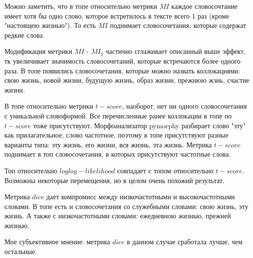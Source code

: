 \documentclass{article}
\begin{document}
    Можно заметить, что в топе относительно метрики $MI$ каждое словосочтание имеет хотя бы одно слово, которое встретилось в тексте всего 1 раз (кроме "настоящею жизнью"). То есть $MI$ поднимает словосочетания, которые содержат редкие слова.

    Модификация метрики $MI$ - $MI_3$ частично сглаживает описанный выше эффект, тк увеличивает значимость словосочетаний, которые встречаются более одного раза. В топе появились словосочетания, которые можно назвать коллокациями: свою жизнь, новой жизни, будущую жизнь, образ жизни, прежнюю жзнь, счастие жизни.

    В топе относительно метрики $t-score$, наоборот, нет ни одного словосочетания с уникальной словоформой. Все перечисленные ранее коллокации в топе по $t-score$ тоже присутствуют. Морфоанализатор pymorphy разбирает слово "эту" как прилагательное, слово частотное, поэтому в топе присутствуют разные варианты типа: эту жизнь, его жизни, вся жизнь, эта жизнь. Метрика $t-score$ поднимает в топ словосочетания, в которых присутствуют частотные слова.

    Топ относительно $loglog-likelihood$ совпадает с топом относительно $t-score$. Возможны некоторые перемещения, но в целом очень похожий результат.

    Метрика $dice$ дает компромисс между низкочастотными и высокочастотными словами. В топе есть и словосочетания со служебными словами: свою жизнь, эту жизнь. А также с низкочастотными словами: ежедневною жизнью, прежней жизнью.

    Мое субъективное мнение: метрика $dice$ в данном случае сработала лучше, чем остальные.
\end{document}
